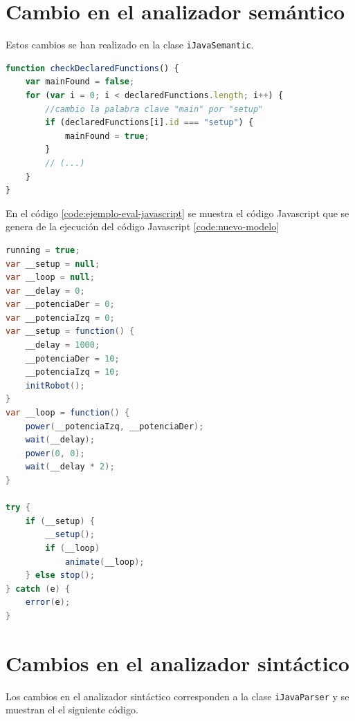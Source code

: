 \section*{Cambio en el analizador semántico}

Estos cambios se han realizado en la clase \texttt{iJavaSemantic}. 

\begin{lstlisting}[language={Javascript},label={code:cambios-ijava-semantico}, caption={Código que muestra los cambios que se han realizado en la clase \texttt{iJavaSemantic} para cambiar la función principal \texttt{main} por \texttt{setup}.}]
function checkDeclaredFunctions() {
	var mainFound = false;
	for (var i = 0; i < declaredFunctions.length; i++) {
		//cambio la palabra clave "main" por "setup"
		if (declaredFunctions[i].id === "setup") {
			mainFound = true;
		}
		// (...)
	}
}
\end{lstlisting}

En el código \ref{code:ejemplo-eval-javascript} se muestra el código Javascript que se genera de la ejecución del código Javascript \ref{code:nuevo-modelo}


\begin{lstlisting}[language={Java},label={code:ejemplo-eval-javascript}, caption={Ejemplo de código Javascript que se genera cuando se ejecuta el código iJava \ref{code:nuevo-modelo}.}]
running = true;
var __setup = null;
var __loop = null;
var __delay = 0;
var __potenciaDer = 0;
var __potenciaIzq = 0;
var __setup = function() {
    __delay = 1000;
    __potenciaDer = 10;
    __potenciaIzq = 10;
    initRobot();
}
var __loop = function() {
    power(__potenciaIzq, __potenciaDer);
    wait(__delay);
    power(0, 0);
    wait(__delay * 2);
}

try {
    if (__setup) {
        __setup();
        if (__loop)
            animate(__loop);
    } else stop();
} catch (e) {
    error(e);
}
\end{lstlisting}

\section*{Cambios en el analizador sintáctico}

Los cambios en el analizador sintáctico corresponden a la clase \texttt{iJavaParser} y se muestran el el siguiente código.


